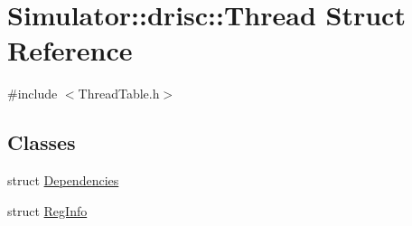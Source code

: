 \hypertarget{struct_simulator_1_1drisc_1_1_thread}{\section{Simulator\+:\+:drisc\+:\+:Thread Struct Reference}
\label{struct_simulator_1_1drisc_1_1_thread}
}


{\ttfamily \#include $<$Thread\+Table.\+h$>$}

\subsection*{Classes}
\begin{DoxyCompactItemize}
\item 
struct \hyperlink{struct_simulator_1_1drisc_1_1_thread_1_1_dependencies}{Dependencies}
\item 
struct \hyperlink{struct_simulator_1_1drisc_1_1_thread_1_1_reg_info}{Reg\+Info}
\end{DoxyCompactItemize}
